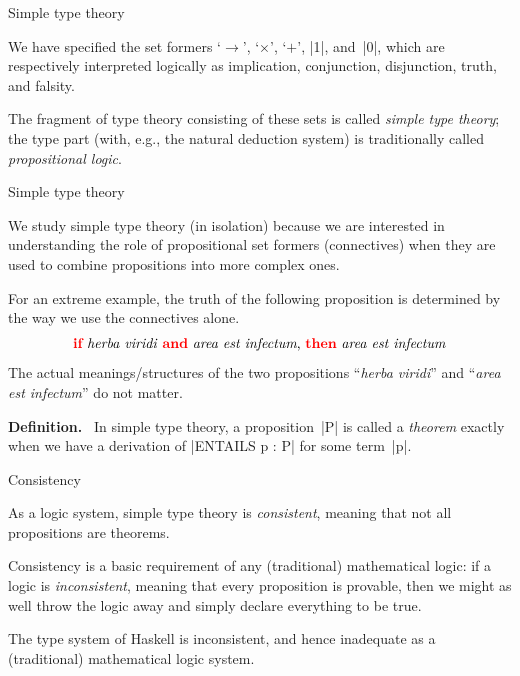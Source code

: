 \documentclass[t,compress,hyperref={hidelinks}]{beamer}
\renewcommand{\emph}[1]{\textit{\color{OxfordRed}#1}}
\newcommand{\marker}[1]{\textbf{\color{OxfordBlue}#1.}~}
\begin{document}
\begin{frame}{Simple type theory}

We have specified the set formers `$\to$', `$\times$', `$+$', |1|, and~|0|, which are respectively interpreted logically as implication, conjunction, disjunction, truth, and falsity.

The fragment of type theory consisting of these sets is called \emph{simple type theory}; the type part (with, e.g., the natural deduction system) is traditionally called \emph{propositional logic}.

\end{frame}

\begin{frame}{Simple type theory}

We study simple type theory (in isolation) because we are interested in understanding the role of propositional set formers (connectives) when they are used to combine propositions into more complex ones.

For an extreme example, the truth of the following proposition is determined by the way we use the connectives alone.
\[ \text{\textbf{\color{red}if} \textit{herba viridi} \textbf{\color{red}and} \textit{area est infectum}, \textbf{\color{red}then} \textit{area est infectum}} \]
The actual meanings/structures of the two propositions ``\textit{herba viridi}'' and ``\textit{area est infectum}'' do not matter.

\marker{Definition} In simple type theory, a proposition~|P| is called a \emph{theorem} exactly when we have a derivation of |ENTAILS p : P| for some term~|p|.

\end{frame}

\begin{frame}{Consistency}

As a logic system, simple type theory is \emph{consistent}, meaning that not all propositions are theorems.

Consistency is a basic requirement of any (traditional) mathematical logic: if a logic is \emph{inconsistent}, meaning that every proposition is provable, then we might as well throw the logic away and simply declare everything to be true.

The type system of Haskell is inconsistent, and hence inadequate as a (traditional) mathematical logic system.

\end{frame}
\end{document}
